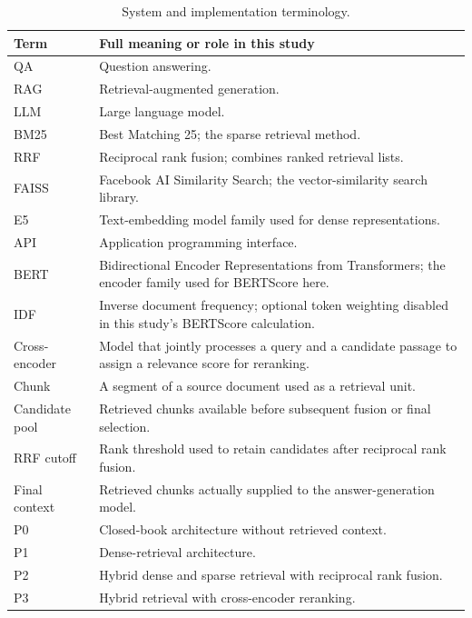 \begin{table}[H]
\centering
\caption{System and implementation terminology.}
\label{tab:system-terminology}
{\small
\renewcommand{\arraystretch}{1.08}
\begin{tabular}{|p{}|p{}|}
\hline
\textbf{Term} & \textbf{Full meaning or role in this study} \\
\hline
QA & Question answering. \\
RAG & Retrieval-augmented generation. \\
LLM & Large language model. \\
BM25 & Best Matching 25; the sparse retrieval method. \\
RRF & Reciprocal rank fusion; combines ranked retrieval lists. \\
FAISS & Facebook AI Similarity Search; the vector-similarity search library. \\
E5 & Text-embedding model family used for dense representations. \\
API & Application programming interface. \\
BERT & Bidirectional Encoder Representations from Transformers; the encoder family used for BERTScore here. \\
IDF & Inverse document frequency; optional token weighting disabled in this study's BERTScore calculation. \\
Cross-encoder & Model that jointly processes a query and a candidate passage to assign a relevance score for reranking. \\
Chunk & A segment of a source document used as a retrieval unit. \\
Candidate pool & Retrieved chunks available before subsequent fusion or final selection. \\
RRF cutoff & Rank threshold used to retain candidates after reciprocal rank fusion. \\
Final context & Retrieved chunks actually supplied to the answer-generation model. \\
P0 & Closed-book architecture without retrieved context. \\
P1 & Dense-retrieval architecture. \\
P2 & Hybrid dense and sparse retrieval with reciprocal rank fusion. \\
P3 & Hybrid retrieval with cross-encoder reranking. \\
\hline
\end{tabular}%
}
\end{table}
